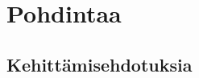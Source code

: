 \documentclass[a4paper,12pt,leqno,titlepage]{article}
\begin{document}
\pagebreak
\section{Pohdintaa}

\subsection{Kehittämisehdotuksia}

\pagebreak

\printbibliography


\end{document}
